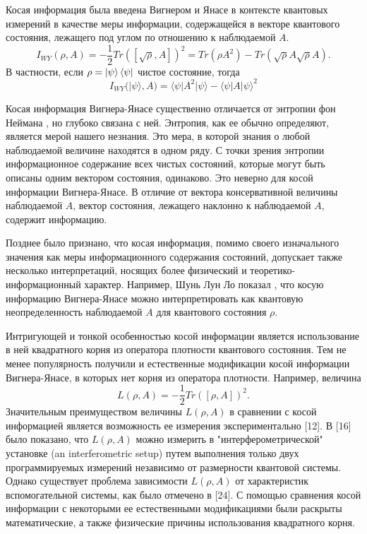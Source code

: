 Косая информация\cite{Wigner1963} была введена Вигнером и Янасе 
в контексте квантовых измерений в качестве меры информации,
содержащейся в векторе квантового состояния, лежащего под углом по отношению к наблюдаемой $A$.
\begin{equation}\label{eq:wyi}
  I_{WY}(\rho, A)
  = -\frac{1}{2} Tr([\sqrt{\rho}, A])^2
  = Tr(\rho A^2) - Tr(\sqrt \rho A \sqrt \rho  A ).
\end{equation}    
% 
В частности, если $\rho = \left| \psi \right\rangle\left\langle \psi \right|$ чистое состояние, тогда 
%
\begin{equation}
  I_{WY}(| \psi \rangle, A)
  = \langle \psi | A^2 | \psi \rangle - \langle \psi | A| \psi \rangle ^2
\end{equation}
  
Косая информация Вигнера-Янасе существенно отличается от энтропии фон Неймана \cite{Wigner1960, Lieb1973prl, Lieb1973, Wehrl1978}, 
но глубоко связана с ней.
Энтропия, как ее обычно определяют, является мерой нашего незнания\cite{Weaver1949}.
Это мера, в которой знания о любой наблюдаемой величине находятся в одном ряду.
С точки зрения энтропии информационное содержание всех чистых состояний,
которые могут быть описаны одним вектором состояния, одинаково. 
Это неверно для косой информации Вигнера-Янасе.
В отличие от вектора консервативной величины наблюдаемой $A$, 
вектор состояния, лежащего наклонно к наблюдаемой $A$, содержит информацию.

Позднее было признано, что косая информация, 
помимо своего изначального значения как меры информационного содержания состояний,
допускает также несколько интерпретаций, 
носящих более физический и теоретико-информационный характер. 
Например, Шунь Лун Ло показал\cite{Luo2003, Luo2005, Luo2005pra, Luo2006, Luo2017} , 
что косую информацию Вигнера-Янасе можно интерпретировать
как квантовую неопределенность наблюдаемой $A$ для квантового состояния $\rho$.

Интригующей и тонкой особенностью косой информации является использование в ней квадратного корня из оператора плотности квантового состояния. 
Тем не менее популярность получили и естественные модификации косой информации Вигнера-Янасе, 
в которых нет корня из оператора плотности.
Например, величина
%
\begin{equation}\label{eq:wyi-modification-l}
  L(\rho, A)
  = -\frac{1}{2} Tr([\rho, A])^2.
\end{equation} 
%
Значительным преимуществом величины $L(\rho, A)$ в сравнении с косой информацией является возможность ее измерения экспериментально [12]. 
В [16] было показано, 
что $L(\rho, A)$ можно измерить в "интерферометрической" установке (an interferometric setup) путем выполнения только двух программируемых измерений независимо от размерности квантовой системы.
Однако существует проблема зависимости $L(\rho, A)$ от характеристик вспомогательной системы, как было отмечено в [24].
С помощью сравнения косой информации с некоторыми ее естественными модификациями были раскрыты\cite{Luo2020} математические, 
а также физические причины использования квадратного корня. 

